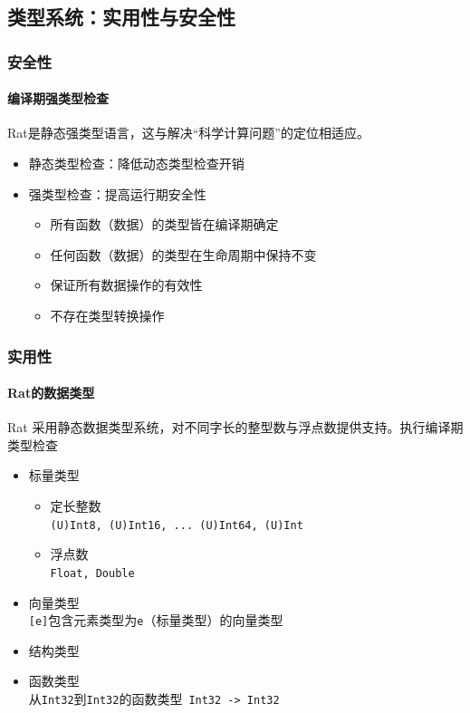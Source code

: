 \documentclass{beamer}
\begin{document}
\subsection{类型系统：实用性与安全性}

\begin{frame}
  \frametitle{安全性}
  \framesubtitle{编译期强类型检查}
  Rat是静态强类型语言，这与解决“科学计算问题”的定位相适应。
  \begin{itemize}
    \item 静态类型检查：降低动态类型检查开销
    \item 强类型检查：提高运行期安全性
    \begin{itemize}
      \item 所有函数（数据）的类型皆在编译期确定
      \item 任何函数（数据）的类型在生命周期中保持不变
      \item 保证所有数据操作的有效性
      \item 不存在类型转换操作
    \end{itemize}
  \end{itemize}
\end{frame}

\begin{frame}
  \frametitle{实用性}
  \framesubtitle{Rat的数据类型}
  Rat 采用静态数据类型系统，对不同字长的整型数与浮点数提供支持。执行编译期类型检查
  \begin{itemize}
    \item 标量类型
      \begin{itemize}
        \item 定长整数\\ \texttt{(U)Int8, (U)Int16, ... (U)Int64, (U)Int}
        \item 浮点数\\ \texttt{Float, Double}
      \end{itemize}
    \item 向量类型\\
      \texttt{[e]}包含元素类型为\texttt{e}（标量类型）的向量类型
    \item 结构类型\\
    \item 函数类型\\
      从\texttt{Int32}到\texttt{Int32}的函数类型~\texttt{Int32 -> Int32} 
  \end{itemize}
\end{frame}
\end{document}
